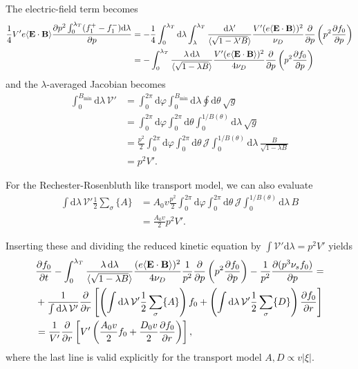 \documentclass[11pt,a4paper]{article}
\newcommand{\rd}{\ensuremath{\mathrm{d}}}
\newcommand{\sub}[1]{\ensuremath{_{\text{#1}}}}
\renewcommand{\b}[1]{\ensuremath{ {\bf #1 } }}
\begin{document}
The electric-field term becomes
\begin{align}
\frac{1}{4} V' e\langle \b{E}\cdot\b{B}\rangle \frac{\partial p^2\int_0^{\lambda_T}(f_1^+-f_1^-)\rd\lambda}{\partial p} &= -\frac{1}{4}\int_0^{\lambda_T}\rd \lambda \int_\lambda^{\lambda_T} \frac{\rd \lambda'}{\langle\sqrt{1-\lambda' B}\rangle} \frac{V'(e\langle \b{E}\cdot\b{B}\rangle)^2}{\nu_D} \frac{\partial}{\partial p} \left(p^2\frac{\partial f_0}{\partial p}\right) \nonumber \\
&= -\int_0^{\lambda_T}\frac{\lambda\,\rd \lambda}{\langle\sqrt{1-\lambda B}\rangle} \frac{V'(e\langle \b{E}\cdot\b{B}\rangle)^2}{4\nu_D} \frac{\partial}{\partial p} \left(p^2\frac{\partial f_0}{\partial p}\right) 
\end{align}
and the $\lambda$-averaged Jacobian becomes
\begin{align}
\int_0^{B\sub{min}}\!\! \rd\lambda \,\mathcal{V}' &= \int_0^{2\pi}\rd\varphi \int_0^{B\sub{min}}\rd\lambda \oint \rd \theta \, \sqrt{g} \nonumber \\
&= \int_0^{2\pi} \rd\varphi \int_0^{2\pi}\rd\theta \int_0^{1/B(\theta)}\rd\lambda \,\sqrt{g} \nonumber \\
&= \frac{p^2}{2}\int_0^{2\pi} \rd\varphi \int_0^{2\pi}\rd\theta \,\mathcal{J}\int_0^{1/B(\theta)}\rd\lambda \,\frac{B}{\sqrt{1-\lambda B}} \nonumber \\
&= p^2V'.
\end{align}


For the Rechester-Rosenbluth like transport model, we can also evaluate
\begin{align}
\int \rd \lambda \, \mathcal{V}' \frac{1}{2}\sum_\sigma\{A\} &= A_0 v\frac{p^2}{2}\int_0^{2\pi} \rd\varphi \int_0^{2\pi}\rd\theta \,\mathcal{J}\int_0^{1/B(\theta)}\rd\lambda \, B \nonumber \\
&= \frac{A_0 v}{2}p^2 V'.
\end{align}

Inserting these and dividing the reduced kinetic equation by $\int \mathcal{V}'\rd\lambda = p^2 V'$ yields
\begin{align}
&\frac{\partial f_0}{\partial t} - \int_0^{\lambda_T}\frac{\lambda\,\rd \lambda}{\langle\sqrt{1-\lambda B}\rangle} \frac{(e\langle \b{E}\cdot\b{B}\rangle)^2}{4\nu_D} \frac{1}{p^2}\frac{\partial}{\partial p} \left(p^2\frac{\partial f_0}{\partial p}\right) - \frac{1}{p^2}\frac{\partial(p^3 \nu_s f_0)}{\partial p} =  \nonumber \\
&+\frac{1}{\int \rd \lambda \, \mathcal{V}' }\frac{\partial}{\partial r}\left[ \left(\int \rd \lambda \, \mathcal{V}' \frac{1}{2}\sum_\sigma\{A\}\right)f_0+  \left(\int \rd \lambda \, \mathcal{V}' \frac{1}{2}\sum_\sigma\{D\}\right)\frac{\partial f_0}{\partial r}\right] \nonumber \\
&=\frac{1}{V'}\frac{\partial}{\partial r}\left[V' \left( \frac{A_0 v}{2} f_0+  \frac{D_0 v}{2}\frac{\partial f_0}{\partial r}\right)\right] ,
\end{align}
where the last line is valid explicitly for the transport model $A,D \propto v|\xi|$.
\end{document}
